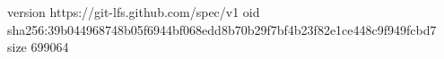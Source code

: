version https://git-lfs.github.com/spec/v1
oid sha256:39b044968748b05f6944bf068edd8b70b29f7bf4b23f82e1ce448c9f949fcbd7
size 699064
